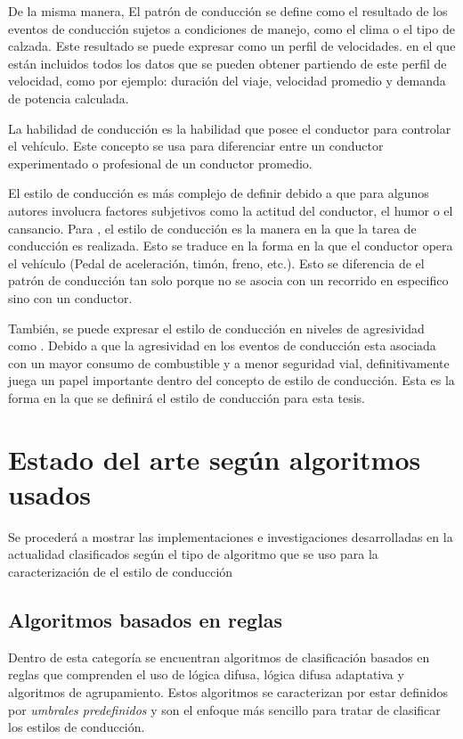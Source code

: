 De la misma manera, El patrón de conducción se define como el resultado de los eventos de conducción sujetos a condiciones de manejo, como el clima o el tipo de calzada. Este resultado se puede expresar como un perfil de velocidades. en el que están incluidos todos los datos que se pueden obtener partiendo de este perfil de velocidad, como por ejemplo: duración del viaje, velocidad promedio y demanda de potencia calculada.

La habilidad de conducción es la habilidad que posee el conductor para controlar el vehículo. Este concepto se usa para diferenciar entre un conductor experimentado o profesional de un conductor promedio.

El estilo de conducción es más complejo de definir debido a que para algunos autores involucra factores subjetivos como la actitud del conductor, el humor o el cansancio. Para \citeauthor{6957822} \cite{6957822}, el estilo de conducción  es la manera en la que la tarea de conducción es realizada. Esto se traduce en la forma en la que el conductor opera el vehículo (Pedal de aceleración, timón, freno, etc.). Esto se diferencia de el patrón de conducción tan solo porque no se asocia con un recorrido en especifico sino con un conductor.

También, se puede expresar el estilo de conducción en niveles de agresividad como \citeauthor{6294318} \cite{6294318}. Debido a que la agresividad en los eventos de conducción esta asociada con un mayor consumo de combustible y a menor seguridad vial, definitivamente juega un papel importante dentro del concepto de estilo de conducción. Esta es la forma en la que se definirá el estilo de conducción para esta tesis.

\section{Estado del arte según algoritmos usados}
Se procederá a mostrar las implementaciones e investigaciones desarrolladas en la actualidad clasificados según el tipo de algoritmo que se uso para la caracterización de el estilo de conducción

\subsection{Algoritmos basados en reglas}
Dentro de esta categoría se encuentran algoritmos de clasificación basados en reglas que comprenden el uso de lógica difusa, lógica difusa adaptativa y algoritmos de agrupamiento. Estos algoritmos se caracterizan por estar definidos por {\it umbrales predefinidos} y son el enfoque más sencillo para tratar de clasificar los estilos de conducción.

